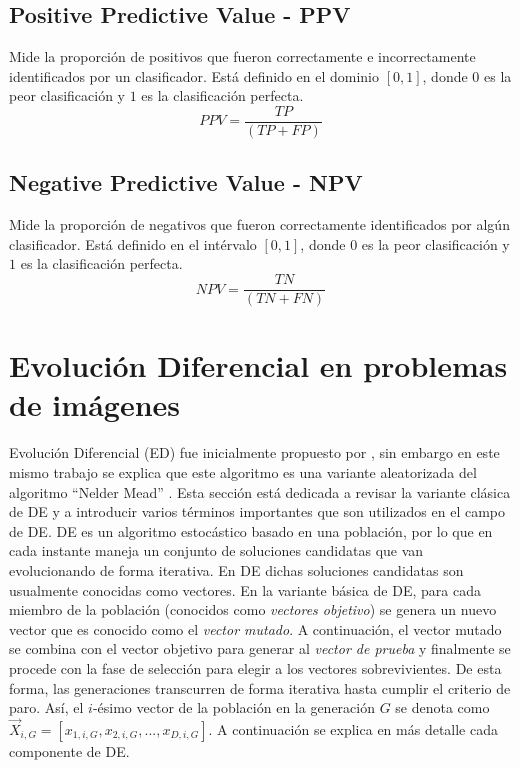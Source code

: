 \documentclass[preprint,12pt]{elsarticle}
\begin{document}
\subsection{Positive Predictive Value - PPV}
Mide la proporción de positivos que fueron correctamente e incorrectamente identificados por un clasificador.
%
Está definido en el dominio $[0, 1]$, donde $0$ es la peor clasificación y $1$ es la clasificación perfecta.
\begin{equation}
    PPV = \frac{TP}{(TP + FP)}
\end{equation}
\subsection{Negative Predictive Value - NPV}
Mide la proporción de negativos que fueron correctamente identificados por algún clasificador.
%
Está definido en el intérvalo $[0, 1]$, donde $0$ es la peor clasificación y $1$ es la clasificación perfecta.
\begin{equation}
    NPV = \frac{TN}{(TN + FN)}
\end{equation}

\section{Evolución Diferencial en problemas de imágenes}

Evolución Diferencial (ED) fue inicialmente propuesto por \citet{price2006differential}, sin embargo en este mismo trabajo se explica que este algoritmo es una variante aleatorizada del algoritmo ``Nelder Mead'' \cite{olsson1975nelder}.
%
Esta sección está dedicada a revisar la variante clásica de DE y a introducir varios términos importantes que son utilizados en el campo de DE.
%
DE es un algoritmo estocástico basado en una población, por lo que en cada instante maneja un conjunto de soluciones candidatas que van evolucionando de forma iterativa.
%
En DE dichas soluciones candidatas son usualmente conocidas como vectores.
%
En la variante básica de DE, para cada miembro de la población (conocidos como \textit{vectores objetivo}) se genera un nuevo vector que es conocido como el \textit{vector mutado}.
%
A continuación, el vector mutado se combina con el vector objetivo para generar al \textit{vector de prueba} y finalmente se procede con la fase de selección para elegir a los vectores sobrevivientes.
%
De esta forma, las generaciones transcurren de forma iterativa hasta cumplir el criterio de paro.
%
Así, el $i$-ésimo vector de la población en la generación $G$ se denota como$\vec{X}_{i,G} = [x_{1,i,G}, x_{2,i,G},..., x_{D,i, G}]$.
%
A continuación se explica en más detalle cada componente de DE.
\end{document}
